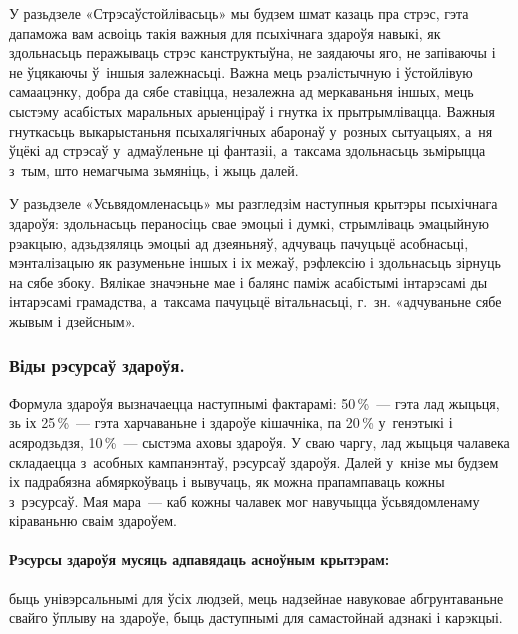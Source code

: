 У разьдзеле «Стрэсаўстойлівасьць» мы будзем шмат казаць пра стрэс, гэта дапаможа вам асвоіць такія важныя для псыхічнага здароўя навыкі, як здольнасьць перажываць стрэс канструктыўна, не заядаючы яго, не запіваючы і не ўцякаючы ў~іншыя залежнасьці. Важна мець рэалістычную і ўстойлівую самаацэнку, добра да сябе ставіцца, незалежна ад меркаваньня іншых, мець сыстэму асабістых маральных арыенціраў і гнутка іх прытрымлівацца. Важныя гнуткасьць выкарыстаньня псыхалягічных абаронаў у~розных сытуацыях, а~ня ўцёкі ад стрэсаў у~адмаўленьне ці фантазіі, а~таксама здольнасьць зьмірыцца з~тым, што немагчыма зьмяніць, і жыць далей.

У разьдзеле «Усьвядомленасьць» мы разгледзім наступныя крытэры псыхічнага здароўя: здольнасьць пераносіць свае эмоцыі і думкі, стрымліваць эмацыйную рэакцыю, адзьдзяляць эмоцыі ад дзеяньняў, адчуваць пачуцьцё асобнасьці, мэнталізацыю як разуменьне іншых і іх межаў, рэфлексію і здольнасьць зірнуць на сябе збоку. Вялікае значэньне мае і балянс паміж асабістымі інтарэсамі ды інтарэсамі грамадства, а~таксама пачуцьцё вітальнасьці, г.~зн. «адчуваньне сябе жывым і дзейсным».

\subsubsection{Віды рэсурсаў здароўя.}

Формула здароўя вызначаецца наступнымі фактарамі: 50\,\%~--- гэта лад жыцьця, зь іх 25\,\%~--- гэта харчаваньне і здароўе кішачніка, па 20\,\% у~генэтыкі і асяродзьдзя, 10\,\%~--- сыстэма аховы здароўя. У сваю чаргу, лад жыцьця чалавека складаецца з~асобных кампанэнтаў, рэсурсаў здароўя. Далей у~кнізе мы будзем іх падрабязна абмяркоўваць і вывучаць, як можна прапампаваць кожны з~рэсурсаў. Мая мара~--- каб кожны чалавек мог навучыцца ўсьвядомленаму кіраваньню сваім здароўем.


\paragraph{Рэсурсы здароўя мусяць адпавядаць асноўным крытэрам:} быць унівэрсальнымі для ўсіх людзей, мець надзейнае навуковае абгрунтаваньне свайго ўплыву на здароўе, быць даступнымі для самастойнай адзнакі і карэкцыі.

